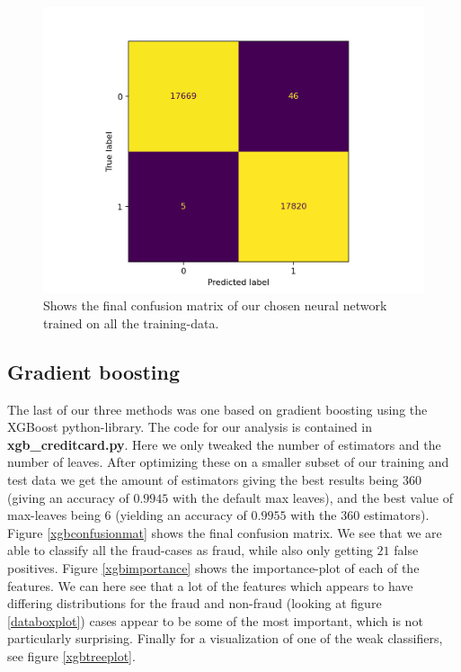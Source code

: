 \documentclass{article}
\begin{document}
\begin{figure}
	\centering
	\includegraphics[scale=0.8]{nn_final_confusion_mat}
	\caption{Shows the final confusion matrix of our chosen neural network
		trained on all the training-data.}
	\label{nnconfusionmat}
\end{figure}


\subsection{Gradient boosting}
The last of our three methods was one based on gradient boosting using the
XGBoost python-library. The code for our analysis is contained in
\textbf{xgb\_creditcard.py}. Here we only tweaked the number of estimators and
the number of leaves. After optimizing these on a smaller subset of our
training and test data we get the amount of estimators giving the best results
being $360$ (giving an accuracy of $0.9945$ with the default max leaves), and
the best value of max-leaves being $6$ (yielding an accuracy of $0.9955$ with
the $360$ estimators). Figure \ref{xgbconfusionmat} shows the final confusion
matrix. We see that we are able to classify all the fraud-cases as fraud, while
also only getting $21$ false positives. Figure \ref{xgbimportance} shows the
importance-plot of each of the features. We can here see that a lot of the
features which appears to have differing distributions for the fraud and
non-fraud (looking at figure \ref{databoxplot}) cases appear to be some of the
most important, which is not particularly surprising. Finally for a
visualization of one of the weak classifiers, see figure \ref{xgbtreeplot}.
\end{document}
